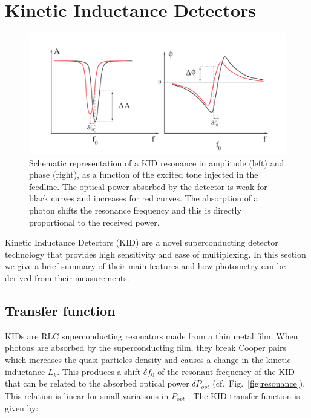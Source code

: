 \section{Kinetic Inductance Detectors}
\label{se:kids}

\begin{figure}
\center
	\includegraphics[clip, angle=0, width=\columnwidth]{Figures/resonance.png}
	\caption{Schematic representation of a KID resonance in amplitude (left) and phase (right), as a function of the excited tone injected in the feedline. The optical power absorbed by the detector is weak for black curves and increases for red curves. The absorption of a photon shifts the resonance frequency and this is directly proportional to the received power.}
	\label{resonance}
\end{figure}

Kinetic Inductance Detectors (KID) are a novel superconducting detector technology
that provides high sensitivity and ease of multiplexing. In this section we give
a brief summary of their main features and how photometry can be derived from
their measurements.

\subsection{Transfer function}

KIDs are RLC superconducting resonators made from a thin metal film. When
photons are absorbed by the superconducting film, they break Cooper pairs which
increases the quasi-particles density and causes a change in the kinetic
inductance $L_{k}$. This produces a shift $\delta f_{0}$ of the resonant
frequency of the KID \citep{2013A&A...551L..12C} that can be related to the
absorbed optical power $\delta P_{opt}$ (cf.~Fig.~\ref{fig:resonance}). This
relation is linear for small variations in $P_{opt}$
\citep{2010ApPhL..96z3511S}. The KID transfer function is given by:

